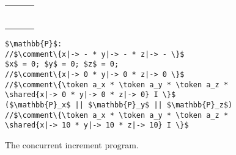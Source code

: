\begin{figure*}
\begin{tabular}{@{}l@{\quad}|@{\quad}l@{\quad}|@{\quad}l@{}}
\begin{lstlisting}
\end{lstlisting}
\end{tabular}
\begin{lstlisting}
$\mathbb{P}$:
//$\comment\{x|-> - * y|-> - * z|-> - \}$
$x$ = 0; $y$ = 0; $z$ = 0;
//$\comment\{x|-> 0 * y|-> 0 * z|-> 0 \}$
//$\comment\{\token a_x * \token a_y * \token a_z * \shared{x|-> 0 * y|-> 0 * z|-> 0} I \}$
($\mathbb{P}_x$ || $\mathbb{P}_y$ || $\mathbb{P}_z$)
//$\comment\{\token a_x * \token a_y * \token a_z * \shared{x|-> 10 * y|-> 10 * z|-> 10} I \}$
\end{lstlisting}

\noindent\makebox[\linewidth]{\rule{\linewidth}{1pt}} \vspace*{-12pt}
\caption{The concurrent increment program.}
\label{fig:concurrentInc}
\end{figure*}

